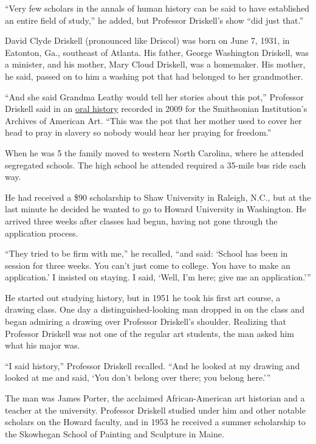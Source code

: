``Very few scholars in the annals of human history can be said to have
established an entire field of study,'' he added, but Professor
Driskell's show ``did just that.''

David Clyde Driskell (pronounced like Driscol) was born on June 7, 1931,
in Eatonton, Ga., southeast of Atlanta. His father, George Washington
Driskell, was a minister, and his mother, Mary Cloud Driskell, was a
homemaker. His mother, he said, passed on to him a washing pot that had
belonged to her grandmother.

``And she said Grandma Leathy would tell her stories about this pot,''
Professor Driskell said in an
\href{https://www.aaa.si.edu/collections/interviews/oral-history-interview-david-driskell-15943\#transcript}{oral
history} recorded in 2009 for the Smithsonian Institution's Archives of
American Art. ``This was the pot that her mother used to cover her head
to pray in slavery so nobody would hear her praying for freedom.''

When he was 5 the family moved to western North Carolina, where he
attended segregated schools. The high school he attended required a
35-mile bus ride each way.

He had received a \$90 scholarship to Shaw University in Raleigh, N.C.,
but at the last minute he decided he wanted to go to Howard University
in Washington. He arrived three weeks after classes had begun, having
not gone through the application process.

``They tried to be firm with me,'' he recalled, ``and said: `School has
been in session for three weeks. You can't just come to college. You
have to make an application.' I insisted on staying. I said, `Well, I'm
here; give me an application.'''

He started out studying history, but in 1951 he took his first art
course, a drawing class. One day a distinguished-looking man dropped in
on the class and began admiring a drawing over Professor Driskell's
shoulder. Realizing that Professor Driskell was not one of the regular
art students, the man asked him what his major was.

``I said history,'' Professor Driskell recalled. ``And he looked at my
drawing and looked at me and said, `You don't belong over there; you
belong here.'''

The man was James Porter, the acclaimed African-American art historian
and a teacher at the university. Professor Driskell studied under him
and other notable scholars on the Howard faculty, and in 1953 he
received a summer scholarship to the Skowhegan School of Painting and
Sculpture in Maine.

